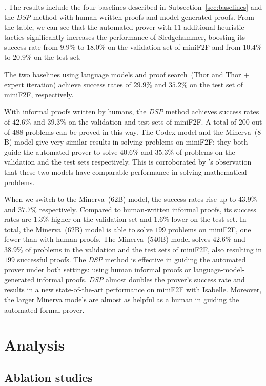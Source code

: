 . The results include the four baselines described in Subsection~\ref{sec:baselines} and the \textit{DSP} method with human-written proofs and model-generated proofs. From the table, we can see that the automated prover with $11$ additional heuristic tactics significantly increases the performance of Sledgehammer, boosting its success rate from $9.9\%$ to $18.0\%$ on the validation set of miniF2F and from $10.4\%$ to $20.9\%$ on the test set.

The two baselines using language models and proof search~(Thor and Thor + expert iteration) achieve success rates of $29.9\%$ and $35.2\%$ on the test set of miniF2F, respectively.

With informal proofs written by humans, the \textit{DSP} method achieves success rates of $42.6\%$ and $39.3\%$ on the validation and test sets of miniF2F. A total of $200$ out of $488$ problems can be proved in this way. The Codex model and the Minerva~($8$B) model give very similar results in solving problems on miniF2F: they both guide the automated prover to solve $40.6\%$ and $35.3\%$ of problems on the validation and the test sets respectively. This is corroborated by \citet{lewkowycz2022solving}'s observation that these two models have comparable performance in solving mathematical problems.

When we switch to the Minerva~($62$B) model, the success rates rise up to $43.9\%$ and $37.7\%$ respectively. Compared to human-written informal proofs, its success rates are $1.3\%$ higher on the validation set and $1.6\%$ lower on the test set. In total, the Minerva~($62$B) model is able to solve $199$ problems on miniF2F, one fewer than with human proofs. The Minerva~($540$B) model solves $42.6\%$ and $38.9\%$ of problems in the validation and the test sets of miniF2F, also resulting in $199$ successful proofs. The \textit{DSP} method is effective in guiding the automated prover under both settings: using human informal proofs or language-model-generated informal proofs. \textit{DSP} almost doubles the prover's success rate and results in a new state-of-the-art performance on miniF2F with Isabelle. Moreover, the larger Minerva models are almost as helpful as a human in guiding the automated formal prover.

\section{Analysis}
\label{sec:analysis}
\subsection{Ablation studies}
